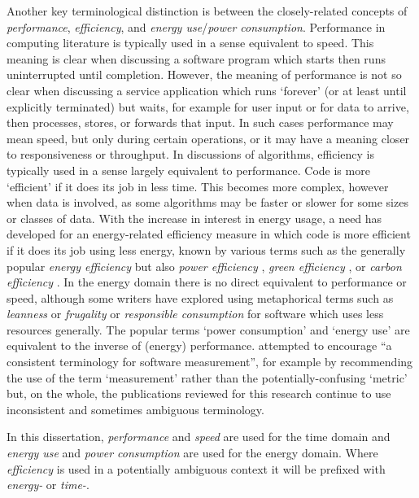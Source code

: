 Another key terminological distinction is between the closely-related concepts of \emph{performance}, \emph{efficiency}, and \emph{energy use}/\emph{power consumption}. Performance in computing literature is typically used in a sense equivalent to speed. This meaning is clear when discussing a software program which starts then runs uninterrupted until completion. However, the meaning of performance is not so clear when discussing a service application which runs `forever' (or at least until explicitly terminated) but waits, for example for user input or for data to arrive, then processes, stores, or forwards that input. In such cases performance may mean speed, but only during certain operations, or it may have a meaning closer to responsiveness or throughput. In discussions of algorithms, efficiency is typically used in a sense largely equivalent to performance. Code is more `efficient' if it does its job in less time. This becomes more complex, however when data is involved, as some algorithms may be faster or slower for some sizes or classes of data. With the increase in interest in energy usage, a need has developed for an energy-related efficiency measure in which code is more efficient if it does its job using less energy, known by various terms such as the generally popular \emph{energy efficiency} but also \emph{power efficiency} \citep{Manner2023} \citep{Chien2021}, \emph{green efficiency} \citep{Salam2018}, or \emph{carbon efficiency} \citep{Dorkal2023}. In the energy domain there is no direct equivalent to performance or speed, although some writers have explored using metaphorical terms such as \emph{leanness} \citep{Wirth1995} or \emph{frugality} \citep{Gancarz2023b} or \emph{responsible consumption} \citep{Becker2015} for software which uses less resources generally. The popular terms `power consumption' and `energy use' are equivalent to the inverse of (energy) performance. \citet{Garcia2006} attempted to encourage \enquote{a consistent terminology for software measurement}, for example by recommending the use of the term `measurement' rather than the potentially-confusing `metric' but, on the whole, the publications reviewed for this research continue to use inconsistent and sometimes ambiguous terminology. 

In this dissertation, \emph{performance} and \emph{speed} are used for the time domain and \emph{energy use} and \emph{power consumption} are used for the energy domain. Where \emph{efficiency} is used in a potentially ambiguous context it will be prefixed with \emph{energy-} or \emph{time-}.

